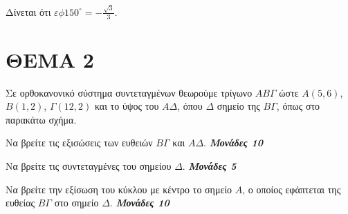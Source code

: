 \documentclass[11pt,a4paper,twoside]{book}
\newcommand{\monades}[1]{
\hspace*{\fill}
\textbf{\textit{\textcolor{maincolor}{Μονάδες #1}}}}
\begin{document}
Δίνεται ότι $\varepsilon \phi 150^\circ = -\frac{\sqrt{3}}{3}$.

\vspace{4mm}

\section*{ΘΕΜΑ 2}

Σε ορθοκανονικό σύστημα συντεταγμένων θεωρούμε τρίγωνο $AB\Gamma$ ώστε $A(5, 6)$, $B(1, 2)$, $\Gamma(12, 2)$ και το ύψος του $A\Delta$, όπου $\Delta$ σημείο της $B\Gamma$, όπως στο παρακάτω σχήμα.

\begin{alist}    \item Να βρείτε τις εξισώσεις των ευθειών $B\Gamma$ και $A\Delta$. \monades{10}
    \item Να βρείτε τις συντεταγμένες του σημείου $\Delta$. \monades{5}
    \item Να βρείτε την εξίσωση του κύκλου με κέντρο το σημείο $A$, ο οποίος εφάπτεται της ευθείας $B\Gamma$ στο σημείο $\Delta$. \monades{10}\end{alist}

\vspace{1cm} %

\begin{center}
\end{center}
\end{document}
